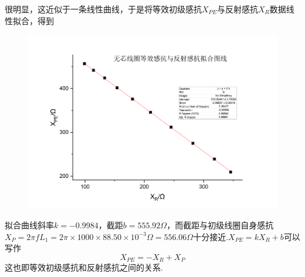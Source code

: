 \documentclass[UTF8]{ctexart}
\begin{document}
很明显，这近似于一条线性曲线，于是将等效初级感抗$X_{PE}$与反射感抗$X_R$数据线性拟合，得到
\begin{figure}[H]\begin{center}
    \includegraphics*[scale = 0.5]{graph11.png}
\end{center}\end{figure}
拟合曲线斜率$k=-0.9984$，截距$b=555.92\Omega$，而截距与初级线圈自身感抗$X_P=2\pi fL_1=2\pi\times 1000\times 88.50\times 10^{-3}\Omega=556.06\Omega$十分接近.$X_{PE}=kX_R+b$可以写作
\begin{equation}X_{PE}=-X_R+X_P\end{equation}
这也即等效初级感抗和反射感抗之间的关系.\par
\end{document}
